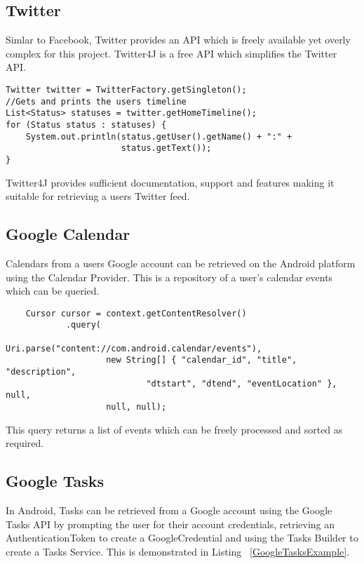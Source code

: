 \subsection{Twitter}

Simlar to Facebook, Twitter provides an API which is freely available yet overly complex for this project. Twitter4J is a free API which simplifies the Twitter API.

\begin{lstlisting}
Twitter twitter = TwitterFactory.getSingleton();
//Gets and prints the users timeline
List<Status> statuses = twitter.getHomeTimeline();
for (Status status : statuses) {
    System.out.println(status.getUser().getName() + ":" +
                       status.getText());
}
\end{lstlisting}

Twitter4J provides sufficient documentation, support and features making it suitable for retrieving a users Twitter feed.  

\subsection{Google Calendar}
Calendars from a users Google account can be retrieved on the Android platform using the Calendar Provider. This is a repository of a user's calendar events which can be queried.

\lstset{language=Java, caption=Calendar Provider example }
\begin{lstlisting}
    Cursor cursor = context.getContentResolver()
            .query(
                    Uri.parse("content://com.android.calendar/events"),
                    new String[] { "calendar_id", "title", "description",
                            "dtstart", "dtend", "eventLocation" }, null,
                    null, null);
\end{lstlisting}

This query returns a list of events which can be freely processed and sorted as required. 
\subsection{Google Tasks}
In Android, Tasks can be retrieved from a Google account using the Google Tasks API by prompting the user for their account credentials, retrieving an AuthenticationToken to create a GoogleCredential and using the Tasks Builder to create a Tasks Service. This is demonstrated in Listing ~\ref{GoogleTasksExample}.

